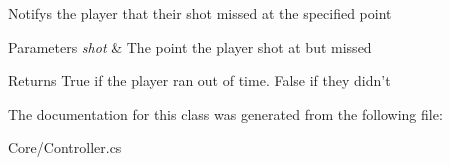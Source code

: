 Notifys the player that their shot missed at the specified point


\begin{DoxyParams}{Parameters}
{\em shot} & The point the player shot at but missed\\
\hline
\end{DoxyParams}
\begin{DoxyReturn}{Returns}
True if the player ran out of time. False if they didn't
\end{DoxyReturn}


The documentation for this class was generated from the following file\-:\begin{DoxyCompactItemize}
\item 
Core/Controller.\-cs\end{DoxyCompactItemize}
